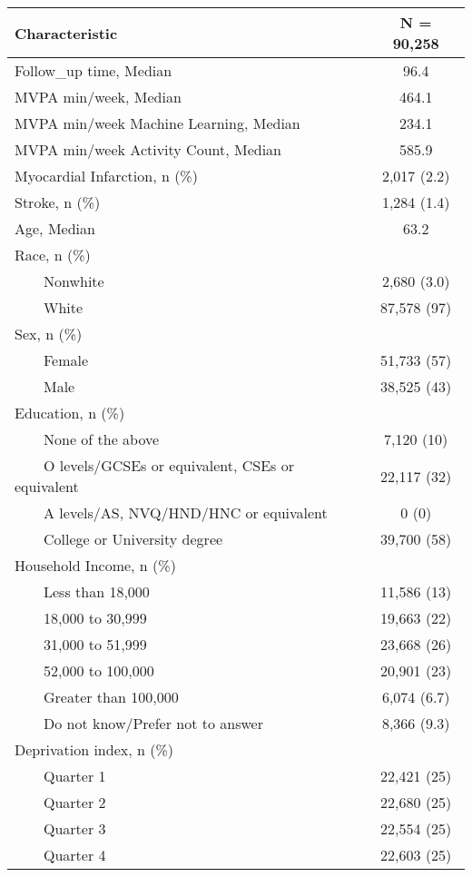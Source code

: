 \begin{table}[!t]
\fontsize{12.0pt}{14.4pt}\selectfont
\begin{tabular*}{\linewidth}{@{\extracolsep{\fill}}lc}
\toprule
\textbf{Characteristic} & \textbf{N = 90,258} \\ 
\midrule\addlinespace[2.5pt]
Follow\_up time, Median & 96.4 \\ 
MVPA min/week, Median & 464.1 \\ 
MVPA min/week Machine Learning, Median & 234.1 \\ 
MVPA min/week Activity Count, Median & 585.9 \\ 
Myocardial Infarction, n (\%) & 2,017 (2.2) \\ 
Stroke, n (\%) & 1,284 (1.4) \\ 
Age, Median & 63.2 \\ 
Race, n (\%) &  \\ 
    Nonwhite & 2,680 (3.0) \\ 
    White & 87,578 (97) \\ 
Sex, n (\%) &  \\ 
    Female & 51,733 (57) \\ 
    Male & 38,525 (43) \\ 
Education, n (\%) &  \\ 
    None of the above & 7,120 (10) \\ 
    O levels/GCSEs or equivalent, CSEs or equivalent & 22,117 (32) \\ 
    A levels/AS, NVQ/HND/HNC or equivalent & 0 (0) \\ 
    College or University degree & 39,700 (58) \\ 
Household Income, n (\%) &  \\ 
    Less than 18,000 & 11,586 (13) \\ 
    18,000 to 30,999 & 19,663 (22) \\ 
    31,000 to 51,999 & 23,668 (26) \\ 
    52,000 to 100,000 & 20,901 (23) \\ 
    Greater than 100,000 & 6,074 (6.7) \\ 
    Do not know/Prefer not to answer & 8,366 (9.3) \\ 
Deprivation index, n (\%) &  \\ 
    Quarter 1 & 22,421 (25) \\ 
    Quarter 2 & 22,680 (25) \\ 
    Quarter 3 & 22,554 (25) \\ 
    Quarter 4 & 22,603 (25) \\ 

\end{tabular*}
\end{table}
